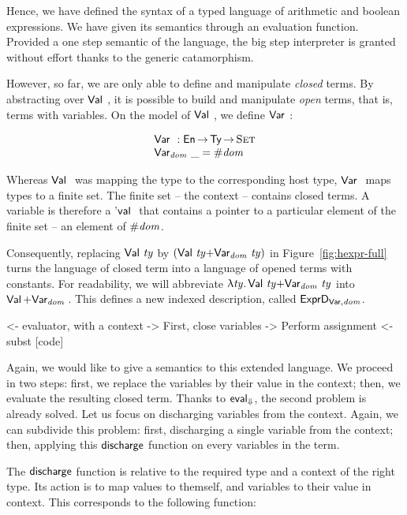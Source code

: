 Hence, we have defined the syntax of a typed language of arithmetic
and boolean expressions. We have given its semantics through an
evaluation function. Provided a one step semantic of the language, the
big step interpreter is granted without effort thanks to the generic
catamorphism.

However, so far, we are only able to define and manipulate
\emph{closed} terms. By abstracting over $\Val{}$, it is possible to
build and manipulate \emph{open} terms, that is, terms with
variables. On the model of $\Val{}$, we define $\Var{}{}$:

\[\stk{
\Var{}{} : \EnumU \To \Ty \To \Set \\
\Var{\V{dom}}{\_} = \EnumT{\V{dom}}
}\]

Whereas $\Val{}$ was mapping the type to the corresponding host type,
$\Var{}{}$ maps types to a finite set. The finite set -- the context
-- contains closed terms. A variable is therefore a $\Eval{}$ that
contains a pointer to a particular element of the finite set -- an
element of $\EnumT{\V{dom}}$. 

Consequently, replacing $\Val{\V{ty}}$ by
$(\SUM{\Val{\V{ty}}}{\Var{\V{dom}}{\V{ty}}})$ in Figure~\ref{fig:hexpr-full} turns
the language of closed term into a language of opened terms with
constants. For readability, we will abbreviate $\LAM{\V{ty}}
\SUM{\Val{\V{ty}}}{\Var{\V{dom}}{\V{ty}}}$ into $\SUM{\Val{\!}}{\Var{\V{dom}}{\!}}$.  This defines a new
indexed description, called $\HExprVarD{\V{dom}}$.

\begin{wstructure}
        <- evaluator, with a context
            -> First, close variables
                -> Perform assignment
                <- subst [code]
\end{wstructure}

\newcommand{\discharge}{\F{discharge}}

Again, we would like to give a semantics to this extended language. We
proceed in two steps: first, we replace the variables by their value
in the context; then, we evaluate the resulting closed term. Thanks to
$\evalH$, the second problem is already solved. Let us focus on
discharging variables from the context. Again, we can subdivide this
problem: first, discharging a single variable from the context; then,
applying this $\discharge$ function on every variables in the term.

The $\discharge$ function is relative to the required type and a
context of the right type. Its action is to map values to themself,
and variables to their value in context. This corresponds to the
following function:

